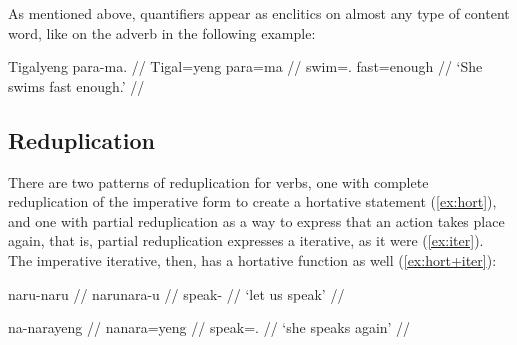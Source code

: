 As mentioned above, quantifiers appear as enclitics on almost any type of 
content word, like on the adverb  in the following example:

\ex
\begingl
	\gla Tigalyeng para-ma. //
	\glb Tigal=yeng para=ma //
	\glc swim=\TsgF{}.\Aarg{} fast=enough //
	\glft `She swims fast enough.' //
\endgl

% 
% 

\xe


\subsection{Reduplication}
\label{subsec:reduplication}

There are two patterns of reduplication for verbs, one with complete
reduplication of the imperative form to create a hortative statement
(\ref{ex:hort}), and one with partial reduplication as a way to express that an
action takes place again, that is, partial reduplication expresses a iterative,
as it were (\ref{ex:iter}). The imperative iterative, then, has a hortative
function as well (\ref{ex:hort+iter}):

\pex
\a\label{ex:hort}\begingl%
	\gla naru-naru //
	\glb naru\til{}nara-u //
	\glc \Hort{}\til{}speak-\Imp{} //
	\glft `let us speak' //
\endgl

\a\label{ex:iter}\begingl
	\gla na-narayeng //
	\glb na\til{}nara=yeng //
	\glc \Iter{}\til{}speak=\TsgF{}.\Aarg{} //
	\glft `she speaks again' //
\endgl

